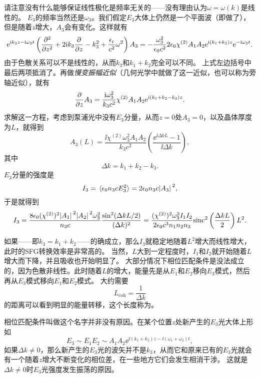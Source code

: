 请注意没有什么能够保证线性极化是频率无关的——没有理由认为$\omega=\omega(k)$是线性的。
$E_3$的频率当然还是$\omega_3$。我们假定$E_3$大体上仍然是一个平面波（即做了），但是随着$z$增大，$A_3$会有变化。这样就有
\[
    \mathrm{e}^{\mathrm{i} k_3 z - \mathrm{i} \omega_3 t} \left( \pdv[2]{z} + 2 \mathrm{i} k_3 \pdv{z} - k_3^2 + \frac{\epsilon_\text{r}}{c^2} \omega^2 \right) A_3 = - \frac{\omega_3^2}{\epsilon_0 c^2} 2 \epsilon_0  \chi^{(2)} A_1 A_2 \mathrm{e}^{\mathrm{i} (k_1 + k_2) z} \mathrm{e}^{-\mathrm{i} \omega_3 t} .
\]
由于色散关系可以不是线性的，从而$k_3$和$k_1 + k_2$完全可以不同。
上式左边括号中最后两项抵消了。再做\emph{慢变振幅近似}（几何光学中就做了这一近似，也可以称为旁轴近似），就有
\[
    \pdv{z} A_3 = \frac{\mathrm{i} \omega_3^2}{k_3 c^2} \chi^{(2)} A_1 A_2 \mathrm{e}^{\mathrm{i} (k_1 + k_2 - k_3) z}.
\]
求解这一方程，考虑到泵浦光中没有$E_3$分量，从而$z=0$处$A_3=0$，以及晶体厚度为$L$，就得到
\begin{equation}
    A_3(L) = \frac{\ii \chi^{(2)} \omega_3^2 A_1 A_2}{k_3 c^2} \left( \frac{\ee^{\ii \Delta k L} - 1}{\ii \Delta k} \right),
    \label{eq:two-pump-a3}
\end{equation}
其中
\begin{equation}
    \Delta k = k_1 + k_2 - k_3.
\end{equation}
$E_3$分量的强度是
\[
    I_3 = \expval*{\epsilon_0 n_3 c E_3^2} = 2 \epsilon_0 n_3 c \abs*{A_3}^2,
\]
于是就得到
\begin{equation}
    I_3 = \frac{8 \epsilon_0 (\chi^{(2)})^2 \abs*{A_1}^2 \abs*{A_2}^2 \omega_3^2}{n_3 c} \frac{\sin^2(\Delta k L / 2)}{(\Delta k)^2} = \frac{(\chi^{(2)})^2 \omega_3^2 I_1 I_2}{2 \epsilon_0 c^3 n_1 n_2 n_3} \mathrm{sinc}^2 \left( \frac{\Delta k L}{2} \right) L^2.
    \label{eq:sfg-intensity}
\end{equation}

如果——即$k_3 = k_1 + k_2$——的确成立，那么$I_3$就稳定地随着$L^2$增大而线性增大，此时的SFG转换效率是非常高的。
当然，$L$大到一定程度时，$I_1$和$I_2$就开始随着$L$增大而下降，并且吸收也开始明显了。
大部分情况下相位匹配条件是没法成立的，因为色散非线性。此时随着$L$的增大，能量先是从$E_1$和$E_2$移向$E_3$模式，然后再从$E_3$模式移向$E_1$和$E_2$模式。
大约需要
\begin{equation}
    L_\text{coh} = \frac{1}{\Delta k}
\end{equation}
的距离可以看到明显的能量转移，这个长度称为。

相位匹配条件叫做这个名字并非没有原因。在某个位置$z$处新产生的$E_3$光大体上形如
\[
    E_3 \sim E_1 E_2 \sim A_1 A_2 \ee^{\ii (k_1 + k_2) z - \ii (\omega_1 + \omega_2) t},
\]
如果$\Delta k \neq 0$，那么新产生的$E_3$光的波矢并不是$k_3$，从而它和原来已有的$E_3$光就会有一个随着$z$增大不断变化的相位差，在一些地方它们会发生相消干涉。
这就是$\Delta k \neq 0$时$E_3$光强度发生振荡的原因。

